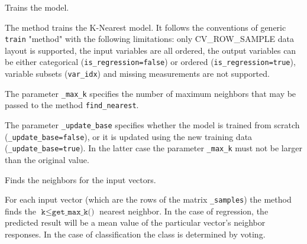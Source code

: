 Trains the model.


The method trains the K-Nearest model. It follows the conventions of generic \texttt{train} "method" with the following limitations: only CV\_ROW\_SAMPLE data layout is supported, the input variables are all ordered, the output variables can be either categorical (\texttt{is\_regression=false}) or ordered (\texttt{is\_regression=true}), variable subsets (\texttt{var\_idx}) and missing measurements are not supported.

The parameter \texttt{\_max\_k} specifies the number of maximum neighbors that may be passed to the method \texttt{find\_nearest}.

The parameter \texttt{\_update\_base} specifies whether the model is trained from scratch \newline (\texttt{\_update\_base=false}), or it is updated using the new training data (\texttt{\_update\_base=true}). In the latter case the parameter \texttt{\_max\_k} must not be larger than the original value.



Finds the neighbors for the input vectors.


For each input vector (which are the rows of the matrix
\texttt{\_samples}) the method finds the $ \texttt{k} \le
\texttt{get\_max\_k()} $ nearest neighbor.  In the case of regression,
the predicted result will be a mean value of the particular vector's
neighbor responses. In the case of classification the class is determined
by voting.

